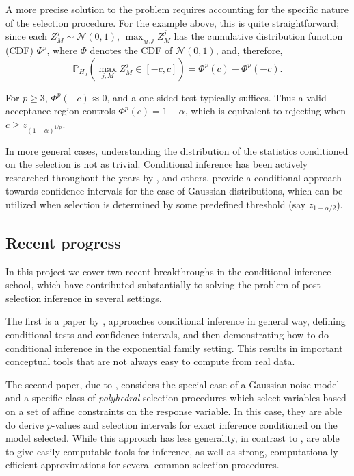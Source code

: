 \documentclass{article}
\newcommand{\Nrm}{\mathcal{N}}
\begin{document}
A more precise solution to the problem requires accounting for the specific
nature of the selection procedure. For the example above, this is quite
straightforward; since each $Z_M^j \sim \Nrm(0, 1)$, $\max_{_M,j} Z_M^j$ has
the cumulative distribution function (CDF) $\Phi^p$, where $\Phi$ denotes the
CDF of $\Nrm(0, 1)$, and, therefore,
\[\mathbb{P}_{H_{0}}\left(\max_{j,M} Z_M^j \in [-c,c] \right)
    = \Phi^{p}\left(c\right)-\Phi^{p}\left(-c\right).\]


For $p \geq 3$, $\Phi^{p}\left(-c\right) \approx 0$, and a one sided test
typically suffices. Thus a valid acceptance region controls
$\Phi^p\left(c\right) = 1 - \alpha$, which is equivalent to rejecting when
$c \geq z_{\left(1-\alpha\right)^{1/p}}$.

In more general cases, understanding the distribution of the statistics
conditioned on the selection is not as trivial. Conditional inference has been
actively researched throughout the years by
\citet{buehler63students,brown67students,olshen73fTest}, and others.
\citet{weinstein13morePower} provide a conditional approach towards confidence
intervals for the case of Gaussian distributions, which can be utilized when
selection is determined by some predefined threshold (say $z_{1-\alpha/2}$).

\subsection{Recent progress}
In this project we cover two recent breakthroughs in the conditional inference
school, which have contributed substantially to solving the problem of
post-selection inference in several settings.

The first is a paper by \citet{fithian14optimal}, approaches conditional
inference in general way, defining conditional tests and confidence intervals,
and then demonstrating how to do conditional inference in the exponential
family setting. This results in important conceptual tools that are not always
easy to compute from real data.

The second paper, due to \citet{taylor14post}, considers the special case of a
Gaussian noise model and a specific class of \emph{polyhedral} selection
procedures which select variables based on a set of affine constraints on the
response variable. In this case, they are able do derive $p$-values and
selection intervals for exact inference conditioned on the model selected.
While this approach has less generality, in contrast to
\citet{fithian14optimal}, \citet{taylor14post} are able to give easily
computable tools for inference, as well as strong, computationally efficient
approximations for several common selection procedures.
\end{document}
